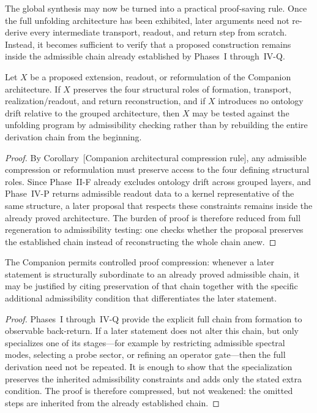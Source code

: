 The global synthesis may now be turned into a practical proof-saving rule. Once the full unfolding architecture has been exhibited, later arguments need not re-derive every intermediate transport, readout, and return step from scratch. Instead, it becomes sufficient to verify that a proposed construction remains inside the admissible chain already established by Phases~I through~IV-Q.

\begin{lemma}\label{lem:structural_admissibility_test}
Let $X$ be a proposed extension, readout, or reformulation of the Companion architecture. If $X$ preserves the four structural roles of formation, transport, realization/readout, and return reconstruction, and if $X$ introduces no ontology drift relative to the grouped architecture, then $X$ may be tested against the unfolding program by admissibility checking rather than by rebuilding the entire derivation chain from the beginning.
\end{lemma}
\begin{proof}
By Corollary~[Companion architectural compression rule], any admissible compression or reformulation must preserve access to the four defining structural roles. Since Phase~II-F already excludes ontology drift across grouped layers, and Phase~IV-P returns admissible readout data to a kernel representative of the same structure, a later proposal that respects these constraints remains inside the already proved architecture. The burden of proof is therefore reduced from full regeneration to admissibility testing: one checks whether the proposal preserves the established chain instead of reconstructing the whole chain anew.
\end{proof}

\begin{proposition}\label{prop:proof_compression_proposition}
The Companion permits controlled proof compression: whenever a later statement is structurally subordinate to an already proved admissible chain, it may be justified by citing preservation of that chain together with the specific additional admissibility condition that differentiates the later statement.
\end{proposition}
\begin{proof}
Phases~I through~IV-Q provide the explicit full chain from formation to observable back-return. If a later statement does not alter this chain, but only specializes one of its stages---for example by restricting admissible spectral modes, selecting a probe sector, or refining an operator gate---then the full derivation need not be repeated. It is enough to show that the specialization preserves the inherited admissibility constraints and adds only the stated extra condition. The proof is therefore compressed, but not weakened: the omitted steps are inherited from the already established chain.
\end{proof}

